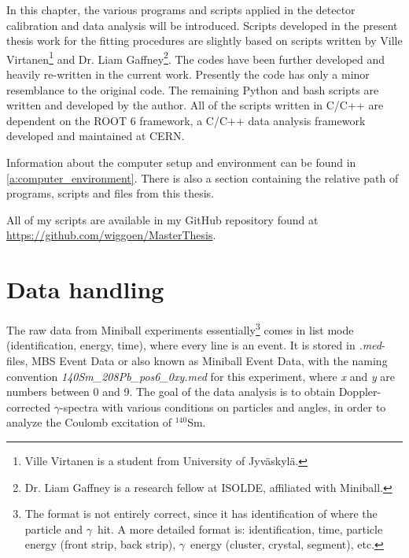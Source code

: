 \documentclass[twoside,english]{uiofysmaster/uiofysmaster}
\newcommand{\Sm}{$^{140}$Sm} %
\newcommand{\ga}{$\gamma$}
\let\orgautoref\autoref
\renewcommand{\autoref}
        {%
		 \def\sectionautorefname{Section}%
		 \def\subsectionautorefname{Section}%
		 \def\subsubsectionautorefname{Section}%
		 \def\chapterautorefname{Chapter}%
          \orgautoref}
\begin{document}
In this chapter, the various programs and scripts applied in the detector calibration and data analysis will be introduced. 
Scripts developed in the present thesis work for the fitting procedures are slightly based on scripts written by Ville Virtanen\footnote{Ville Virtanen is a student from University of Jyväskylä.} and Dr. Liam Gaffney\footnote{Dr. Liam Gaffney is a research fellow at ISOLDE, affiliated with Miniball.}. 
The codes have been further developed and heavily re-written in the current work. 
Presently the code has only a minor resemblance to the original code. 
The remaining Python and bash scripts are written and developed by the author.
All of the scripts written in C/C++ are dependent on the ROOT 6 framework, a C/C++ data analysis framework developed and maintained at CERN.

Information about the computer setup and environment can be found in \autoref{a:computer_environment}. There is also a section containing the relative path of programs, scripts and files from this thesis.

All of my scripts are available in my GitHub repository found at \\ \url{https://github.com/wiggoen/MasterThesis}.

\section{Data handling}
The raw data from Miniball experiments essentially\footnote{The format is not entirely correct, since it has identification of where the particle and \ga\ hit. 
A more detailed format is: identification, time, particle energy (front strip, back strip), \ga\ energy (cluster, crystal, segment), etc.} comes in list mode (identification, energy, time), where every line is an event. 
It is stored in \textit{.med}-files, MBS Event Data or also known as Miniball Event Data, with the naming convention \textit{140Sm\_208Pb\_pos6\_0xy.med} for this experiment, where \textit{x} and \textit{y} are numbers between 0 and 9. 
The goal of the data analysis is to obtain Doppler-corrected \ga-spectra with various conditions on particles and angles, in order to analyze the Coulomb excitation of \Sm. 

\end{document}
